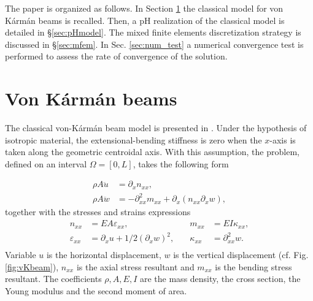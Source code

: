 \documentclass{ifacconf}
\newcommand{\secref}[1]{\S\ref{#1}}
\begin{document}
The paper is organized as follows. In Section \ref{sec:vK_beams} the classical model for von K\'arm\'an beams is recalled. Then, a pH realization of the classical model is detailed in \secref{sec:pHmodel}. The mixed finite elements discretization strategy is discussed in \secref{sec:mfem}. In Sec. \ref{sec:num_test} a numerical convergence test is performed to assess the rate of convergence of the solution.



\section{Von K\'arm\'an beams}\label{sec:vK_beams}


The classical von-K\'arm\'an beam model is presented in \cite[Chapter 4]{reddy2010introduction}. Under the hypothesis of isotropic material, the extensional-bending stiffness is zero when the $x$-axis is taken along the geometric centroidal axis. With this assumption, the problem, defined on an interval $\Omega = [0, L]$, takes the following form

\begin{equation}\label{eq:class}
	\begin{aligned}
		\rho A \ddot{u} &= \partial_x n_{xx}, \\
		\rho A \ddot{w} &= -\partial^2_{xx} m_{xx} + \partial_x(n_{xx} \partial_x w),
	\end{aligned} 
\end{equation}
together with the stresses and strains expressions
\begin{equation}
	\begin{aligned}
		n_{xx} &= EA \varepsilon_{xx}, \\
		\varepsilon_{xx} &= \partial_x u + 1/2 (\partial_x w)^2, \\
	\end{aligned} \quad
	\begin{aligned}
		m_{xx} &= EI \kappa_{xx}, \\
		\kappa_{xx} &=\partial^2_{xx} w. \\
	\end{aligned} 
\end{equation}
Variable $u$ is the horizontal displacement, $w$ is the vertical displacement (cf. Fig. \ref{fig:vKbeam}), $n_{xx}$ is the axial stress resultant and $m_{xx}$ is the bending stress resultant. The coefficients $\rho, A, E, I$ are the mass density, the cross section, the Young modulus and the second moment of area.
\end{document}
